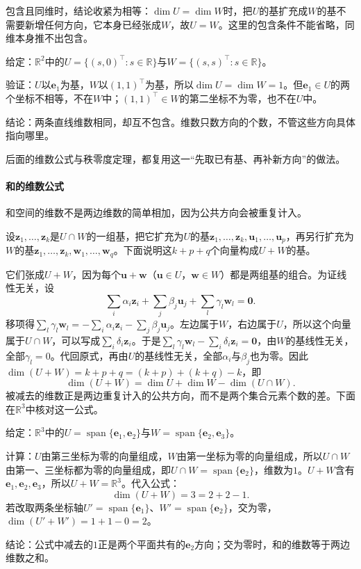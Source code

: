 包含且同维时，结论收紧为相等：$\dim U=\dim W$时，把$U$的基扩充成$W$的基不需要新增任何方向，它本身已经张成$W$，故$U=W$。这里的包含条件不能省略，同维本身推不出包含。
\begin{example}[反例：同维而互不包含的两条直线]
\label{ex:ls-equal-dimension-not-nested}
给定：$\mathbb R^2$中的$U=\{(s,0)^\top:s\in\mathbb R\}$与$W=\{(s,s)^\top:s\in\mathbb R\}$。

验证：$U$以$\bm e_1$为基，$W$以$(1,1)^\top$为基，所以$\dim U=\dim W=1$。但$\bm e_1\in U$的两个坐标不相等，不在$W$中；$(1,1)^\top\in W$的第二坐标不为零，也不在$U$中。

结论：两条直线维数相同，却互不包含。维数只数方向的个数，不管这些方向具体指向哪里。
\end{example}
后面的维数公式与秩零度定理，都复用这一“先取已有基、再补新方向”的做法。

\paragraph{和的维数公式}
和空间的维数不是两边维数的简单相加，因为公共方向会被重复计入。

设$\bm z_1,\ldots,\bm z_k$是$U\cap W$的一组基，把它扩充为$U$的基$\bm z_1,\ldots,\bm z_k,\bm u_1,\ldots,\bm u_p$，再另行扩充为$W$的基$\bm z_1,\ldots,\bm z_k,\bm w_1,\ldots,\bm w_q$。下面说明这$k+p+q$个向量构成$U+W$的基。

它们张成$U+W$，因为每个$\bm u+\bm w$（$\bm u\in U$，$\bm w\in W$）都是两组基的组合。为证线性无关，设
\[
 \sum_i\alpha_i\bm z_i+\sum_j\beta_j\bm u_j+\sum_l\gamma_l\bm w_l=\bm0 .
\]
移项得$\sum_l\gamma_l\bm w_l=-\sum_i\alpha_i\bm z_i-\sum_j\beta_j\bm u_j$。左边属于$W$，右边属于$U$，所以这个向量属于$U\cap W$，可以写成$\sum_i\delta_i\bm z_i$。于是$\sum_l\gamma_l\bm w_l-\sum_i\delta_i\bm z_i=\bm0$，由$W$的基线性无关，全部$\gamma_l=0$。代回原式，再由$U$的基线性无关，全部$\alpha_i$与$\beta_j$也为零。因此$\dim(U+W)=k+p+q=(k+p)+(k+q)-k$，即
\begin{equation}
 \dim(U+W)=\dim U+\dim W-\dim(U\cap W).
 \label{eq:ls-dimension-formula}
\end{equation}
被减去的维数正是两边重复计入的公共方向，而不是两个集合元素个数的差。下面在$\mathbb R^3$中核对这一公式。
\begin{example}[两个坐标平面的和]
\label{ex:ls-dimension-formula-planes}
给定：$\mathbb R^3$中的$U=\operatorname{span}\{\bm e_1,\bm e_2\}$与$W=\operatorname{span}\{\bm e_2,\bm e_3\}$。

计算：$U$由第三坐标为零的向量组成，$W$由第一坐标为零的向量组成，所以$U\cap W$由第一、三坐标都为零的向量组成，即$U\cap W=\operatorname{span}\{\bm e_2\}$，维数为$1$。$U+W$含有$\bm e_1,\bm e_2,\bm e_3$，所以$U+W=\mathbb R^3$。代入公式：
\[
 \dim(U+W)=3=2+2-1 .
\]
若改取两条坐标轴$U'=\operatorname{span}\{\bm e_1\}$、$W'=\operatorname{span}\{\bm e_2\}$，交为零，$\dim(U'+W')=1+1-0=2$。

结论：公式中减去的$1$正是两个平面共有的$\bm e_2$方向；交为零时，和的维数等于两边维数之和。
\end{example}

